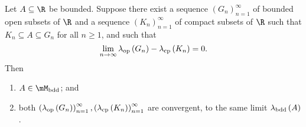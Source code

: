 \documentclass[pmath450]{subfiles}
\begin{document}
    \begin{prop}{}
        Let $A\subseteq\R$ be bounded. Suppose there exist a sequence $\left( G_{n} \right)^{\infty}_{n=1}$ of bounded open subsets of $\R$ and a sequence $\left( K_{n} \right)^{\infty}_{n=1}$ of compact subsets of $\R$ such that $K_n\subseteq A\subseteq G_n$ for all $n\geq 1$, and such that
        \begin{equation}
            \lim_{n\to\infty}\lambda_{\operatorname{op}}\left( G_n \right)-\lambda_{\operatorname{cp}}\left( K_n \right)=0.
        \end{equation}
        Then
        \begin{enumerate}
            \item $A\in\mM_{\bdd}$; and
            \item both $\left( \lambda_{\operatorname{op}}\left( G_n \right) \right)^{\infty}_{n=1}, \left( \lambda_{\operatorname{cp}}\left( K_n \right) \right)^{\infty}_{n=1}$ are convergent, to the same limit $\lambda_{\operatorname{bdd}}\left( A \right)$.
        \end{enumerate}
    \end{prop}
\end{document}
